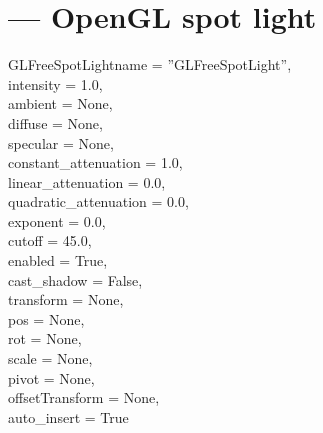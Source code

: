 
\section{ ---
         OpenGL spot light}

\begin{classdesc}{GLFreeSpotLight}{name = ''GLFreeSpotLight'',\\ 
                       intensity = 1.0,\\
                       ambient = None,\\
                       diffuse = None,\\
                       specular = None,\\
                       constant_attenuation = 1.0,\\
                       linear_attenuation = 0.0,\\
                       quadratic_attenuation = 0.0,\\
                       exponent = 0.0,\\
                       cutoff = 45.0,\\
                       enabled = True,\\
                       cast_shadow = False,\\
                       transform = None,\\
                       pos = None,\\
                       rot = None,\\
                       scale = None,\\
                       pivot = None,\\
                       offsetTransform = None,\\
                       auto_insert = True}

\end{classdesc}


